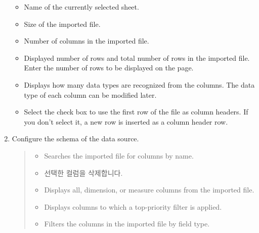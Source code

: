 \documentclass[letterpaper,10pt,english]{sphinxmanual}
\begin{document}
\begin{enumerate}
\begin{itemize}
\item {} 
 Name of the currently selected sheet.

\item {} 
 Size of the imported file.

\item {} 
 Number of columns in the imported file.

\item {} 
 Displayed number of rows and total number of rows in the imported file. Enter the number of rows to be displayed on the page.

\item {} 
 Displays how many data types are recognized from the columns. The data type of each column can be modified later.

\item {} 
 Select the check box to use the first row of the file as column headers. If you don’t select it, a new row is inserted as a column header row.

\end{itemize}

\item {} 
Configure the schema of the data source.
\begin{quote}

\begin{figure}[H]
\centering

\noindent{}
\end{figure}
\begin{itemize}
\item {} 
 Searches the imported file for columns by name.

\item {} 
  선택한 컬럼을 삭제합니다.

\item {} 
 Displays all, dimension, or measure columns from the imported file.

\item {} 
 Displays columns to which a top-priority filter is applied.

\item {} 
 Filters the columns in the imported file by field type.


\end{itemize}
\end{quote}
\end{enumerate}
\end{document}
